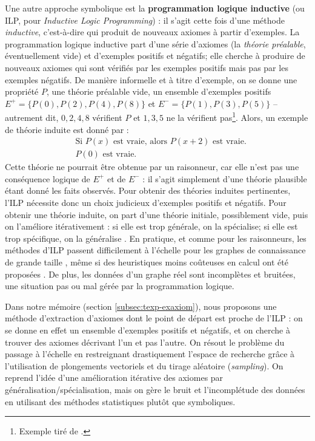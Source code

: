 Une autre approche symbolique \cite{cropper2020turning} est la \textbf{programmation logique inductive} (ou ILP, pour \textit{Inductive Logic Programming}) \cite{nienhuys1997foundations, de2008probabilistic}: il s'agit cette fois d'une méthode \textit{inductive}, c'est-à-dire qui produit de nouveaux axiomes à partir d'exemples. La programmation logique inductive part d'une série d'axiomes (la \textit{théorie préalable}, éventuellement vide) et d'exemples positifs et négatifs; elle cherche à produire de nouveaux axiomes qui sont vérifiés par les exemples positifs  mais pas par les exemples négatifs. De manière informelle et à titre d'exemple, on se donne une propriété $P$, une théorie préalable vide, un ensemble d'exemples positifs $E^+=\{P(0), P(2), P(4), P(8) \}$ et $E^- = \{ P(1), P(3), P(5) \}$ – autrement dit, $0, 2, 4, 8$ vérifient $P$ et $1, 3, 5$ ne la vérifient pas\footnote{Exemple tiré de \cite{nienhuys1997foundations}.}. Alors, un exemple de théorie induite est donné par :
\begin{align}
    & \textrm{Si } P(x) \textrm{ est vraie, alors } P(x + 2) \textrm{ est vraie.} \\
    & P(0) \textrm{ est vraie.}
\end{align}
Cette théorie ne pourrait être obtenue par un raisonneur, car elle n'est pas une conséquence logique de $E^+$ et de $E^-$ : il s'agit simplement d'une théorie plausible étant donné les faits observés. Pour obtenir des théories induites pertinentes, l'ILP nécessite donc un choix judicieux d'exemples positifs et négatifs.
Pour obtenir une théorie induite, 
on part d'une théorie initiale, possiblement vide, puis on l'améliore itérativement : si elle est trop générale, on la spécialise; si elle est trop spécifique, on la généralise \cite[p. 169]{nienhuys1997foundations}.
En pratique, et comme pour les raisonneurs, les méthodes d'ILP passent difficilement à l'échelle pour les graphes de connaissance de grande taille \cite{srinivasan2012data}, même si des heuristiques moins coûteuses en calcul ont été proposées \cite{zeng2014quickfoil}. De plus, les données d'un graphe réel sont incomplètes et bruitées, une situation pas ou mal gérée par la programmation logique. 

Dans notre mémoire (section \ref{subsec:texp-exaxiom}), nous proposons une méthode d'extraction d'axiomes dont le point de départ est proche de l'ILP : on se donne en effet un ensemble d'exemples positifs et négatifs, et on cherche à trouver des axiomes décrivant l'un et pas l'autre. On résout le problème du passage à l'échelle en restreignant drastiquement l'espace de recherche grâce à l'utilisation de plongements vectoriels et du tirage aléatoire (\textit{sampling}). On reprend l'idée d'une amélioration itérative des axiomes par généralisation/spécialisation, mais on gère le bruit et l'incomplétude des données en utilisant des méthodes statistiques plutôt que symboliques.

